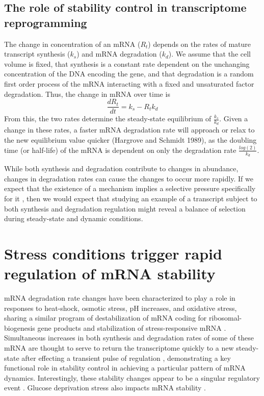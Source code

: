 \subsection{The role of stability control in transcriptome
reprogramming}

The change in concentration of an mRNA ($R_t$) depends
on the rates of mature transcript synthesis ($k_s$) and mRNA
degradation ($k_d$). We assume that the cell volume is fixed, that
synthesis is a constant rate dependent on the unchanging concentration
of the DNA encoding the gene, and that degradation is a random first
order process of the mRNA interacting with a fixed and unsaturated
factor degradation. Thus, the change in mRNA over time is $$
\frac{dR_t}{dt} = k_s - R_t k_d$$ From this, the two rates determine
the steady-state equilibrium of $\frac{k_s}{k_d}$. Given a change in
these rates, a faster mRNA degradation rate will approach or relax to
the new equilibrium value quicker (Hargrove and Schmidt 1989), as the
doubling time (or half-life) of the mRNA is dependent on only the
degradation rate $\frac{log(2)}{k_d}$.  

While both synthesis and
degradation contribute to changes in abundance, changes in degradation
rates can cause the changes to occur more rapidly. If we expect that
the existence of a mechanism implies a selective pressure specifically
for it 
\parencite{gould1979spandrels},
then we would expect that studying
an example of a transcript subject to both synthesis and degradation
regulation might reveal a balance of selection during steady-state and
dynamic conditions. 

\section{Stress conditions trigger rapid regulation of mRNA stability}

mRNA degradation rate changes have been characterized
to play a role in responses to heat-shock, osmotic stress, pH
increases, and oxidative stress, sharing a similar program of
destabilization of mRNA coding for ribosomal-biogenesis gene products
and stabilization of stress-responsive mRNA 
\parencite{canadell2015impact,molina2008comprehensive,shalem2011transcriptome,romero2009specific,molin2009mrna,castells2011heat,miller2011dynamic,garre2013nonsense}.
Simultaneous increases in both synthesis and
degradation rates of some of these mRNA are thought to serve to return
the transcriptome quickly to a new steady-state after effecting a
transient pulse of regulation 
\parencite{shalem2008transient,rabani2011metabolic},
demonstrating a key functional role in stability control in
achieving a particular pattern of mRNA dynamics. Interestingly, these
stability changes appear to be a singular regulatory event
\parencite{perez2013eukaryotic}. 
Glucose deprivation stress also impacts mRNA stability 
\parencite{munchel2011dynamic}.

